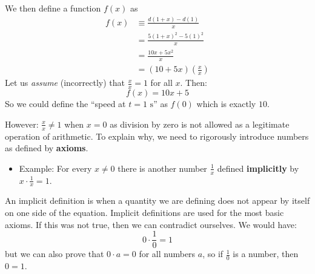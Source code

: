 \begin{itemize}
\begin{center}
    \end{center}
    We then define a function $f(x)$ as
    \begin{align}
        f(x) &\equiv \frac{d(1+x)-d(1)}{x} \\ 
        &= \frac{5(1+x)^2-5(1)^2}{x} \\ 
        &= \frac{10x+5x^2}{x} \\ 
        &= (10+5x)\left(\frac{x}{x}\right)
    \end{align}
    Let us \textit{assume} (incorrectly) that $\frac{x}{x}=1$ for all $x$. Then:
    \begin{equation}
        f(x) = 10x+5
        \label{eq:}
    \end{equation}
    So we could define the ``speed at $t=1 \text{ s}$'' as $f(0)$ which is exactly $10$.
    \begin{warning}
        However: $\frac{x}{x} \neq 1$ when $x=0$ as division by zero is not allowed as a legitimate operation of arithmetic. To explain why, we need to rigorously introduce numbers as defined by \textbf{axioms}.
        \begin{itemize}
            \item Example: For every $x\neq 0$
            there is another number $\frac{1}{x}$ defined \textbf{implicitly} by $x \cdot \frac{1}{x} =1$.
        \end{itemize}
        \vspace{2mm}

        An implicit definition is when a quantity we are defining does not appear by itself on one side of the equation. Implicit definitions are used for the most basic axioms. If this was not true, then we can contradict ourselves. We would have:
        \begin{equation}
            0 \cdot \frac{1}{0} = 1
            \label{eq:}
        \end{equation}
        but we can also prove that $0\cdot a=0$ for all numbers $a$, so if $\frac{1}{0}$ is a number, then $0=1$.
        \vspace{2mm}


\end{warning}
\end{itemize}
